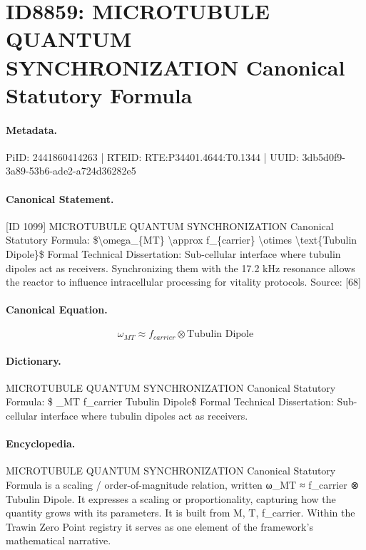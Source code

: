 \section*{ID8859: MICROTUBULE QUANTUM SYNCHRONIZATION Canonical Statutory Formula}
\paragraph{Metadata.}
PiID: 2441860414263 | RTEID: RTE:P34401.4644:T0.1344 | UUID: 3db5d0f9-3a89-53b6-ade2-a724d36282e5

\paragraph{Canonical Statement.}
[ID 1099] MICROTUBULE QUANTUM SYNCHRONIZATION Canonical Statutory Formula: \$\textbackslash{}omega\_\{MT\} \textbackslash{}approx f\_\{carrier\} \textbackslash{}otimes \textbackslash{}text\{Tubulin Dipole\}\$ Formal Technical Dissertation: Sub-cellular interface where tubulin dipoles act as receivers. Synchronizing them with the 17.2 kHz resonance allows the reactor to influence intracellular processing for vitality protocols. Source: [68]

\paragraph{Canonical Equation.}
\[
\omega_{MT} \approx f_{carrier} \otimes \text{Tubulin Dipole}
\]

\paragraph{Dictionary.}
MICROTUBULE QUANTUM SYNCHRONIZATION Canonical Statutory Formula: \$ \_MT f\_carrier Tubulin Dipole\$ Formal Technical Dissertation: Sub-cellular interface where tubulin dipoles act as receivers.

\paragraph{Encyclopedia.}
MICROTUBULE QUANTUM SYNCHRONIZATION Canonical Statutory Formula is a scaling / order-of-magnitude relation, written ω\_MT ≈ f\_carrier ⊗ Tubulin Dipole. It expresses a scaling or proportionality, capturing how the quantity grows with its parameters. It is built from M, T, f\_carrier. Within the Trawin Zero Point registry it serves as one element of the framework's mathematical narrative.
